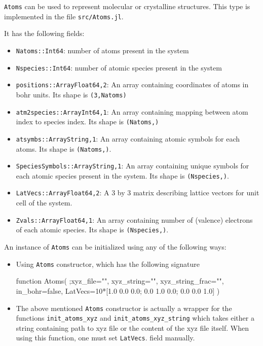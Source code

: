 \documentclass[a4paper,10pt]{paper}
\newcommand{\jlcode}[1]{\texttt{#1}}
\begin{document}
\texttt{Atoms} can be used to represent molecular or crystalline structures.
This type is implemented in the file \texttt{src/Atoms.jl}.

It has the following fields:
\begin{itemize}
%
\item \jlcode{Natoms::Int64}: number of atoms present in the system
%
\item \jlcode{Nspecies::Int64}: number of atomic species present in the system
%
\item \jlcode{positions::Array{Float64,2}}: An array containing coordinates of atoms
  in bohr units. Its shape is \jlcode{(3,Natoms)}
%
\item \jlcode{atm2species::Array{Int64,1}}: An array containing mapping between atom index
  to species index. Its shape is \jlcode{(Natoms,)}
%
\item \jlcode{atsymbs::Array{String,1}}: An array containing atomic symbols for each atoms.
  Its shape is \jlcode{(Natoms,)}.
%
\item \jlcode{SpeciesSymbols::Array{String,1}}: An array containing unique symbols
  for each atomic species present in the system. Its shape is \jlcode{(Nspecies,)}.
%
\item \jlcode{LatVecs::Array{Float64,2}}: A 3 by 3 matrix describing lattice vectors for unit
  cell of the system.
%
\item \jlcode{Zvals::Array{Float64,1}}: An array containing number of (valence)
  electrons of each atomic species. Its shape is \verb|(Nspecies,)|.
\end{itemize}

An instance of \jlcode{Atoms} can be initialized using any of the following ways:

\begin{itemize}
\item Using \jlcode{Atoms} constructor, which has the following signature
%
\begin{juliacode}
function Atoms( ;xyz_file="", xyz_string="", xyz_string_frac="",
                in_bohr=false,
                LatVecs=10*[1.0 0.0 0.0; 0.0 1.0 0.0; 0.0 0.0 1.0] )
\end{juliacode}
%
\item The above mentioned \jlcode{Atoms} constructor is actually a wrapper for the functions
  \jlcode{init_atoms_xyz} and \jlcode{init_atoms_xyz_string} which takes either
  a string containing path to xyz file or the content of the xyz file
  itself. When using this function, one must set \jlcode{LatVecs}.
  field manually.
\end{itemize}
\end{document}
